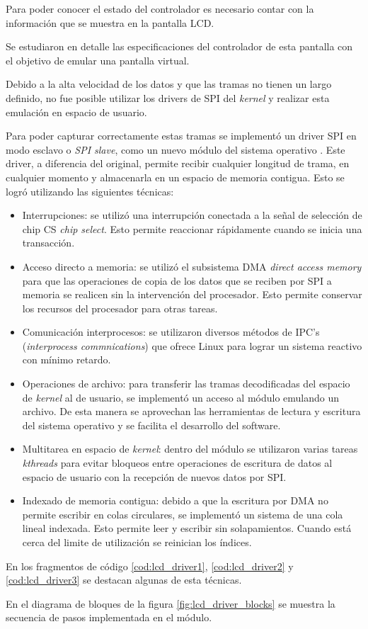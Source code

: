       Para poder conocer el estado del controlador es necesario contar con la información que se muestra en la pantalla LCD.\par
      Se estudiaron en detalle las especificaciones del controlador de esta pantalla con el objetivo de emular una pantalla virtual.\par
      Debido a la alta velocidad de los datos y que las tramas no tienen un largo definido, no fue posible utilizar los drivers de SPI del \textit{kernel} y realizar esta emulación en espacio de usuario.\par
      Para poder capturar correctamente estas tramas se implementó un driver SPI en modo esclavo o \textit{SPI slave}, como un nuevo módulo del sistema operativo \citep{ldd3}.
      Este driver, a diferencia del original, permite recibir cualquier longitud de trama, en cualquier momento y almacenarla en un espacio de memoria contigua.
      Esto se logró utilizando las siguientes técnicas:
      \begin{itemize}
         \item {Interrupciones: se utilizó una interrupción conectada a la señal de selección de chip CS \textit{chip select}. Esto permite reaccionar rápidamente cuando se inicia una transacción.}
         \item {Acceso directo a memoria: se utilizó el subsistema DMA \textit{direct access memory} para que las operaciones de copia de los datos que se reciben por SPI a memoria se realicen sin la intervención del procesador. Esto permite conservar los recursos del procesador para otras tareas.}
         \item{Comunicación interprocesos: se utilizaron diversos métodos de IPC's \citep{WEBSITE:kerneldocs} (\textit{interprocess commnications}) que ofrece Linux para lograr un sistema reactivo con mínimo retardo.}
         \item{Operaciones de archivo: para transferir las tramas decodificadas del espacio de \textit{kernel} al de usuario, se implementó un acceso al módulo emulando un archivo. De esta manera se aprovechan las herramientas de lectura y escritura del sistema operativo y se facilita el desarrollo del software.}
         \item{Multitarea en espacio de \textit{kernel}: dentro del módulo se utilizaron varias tareas \textit{kthreads} para evitar bloqueos entre operaciones de escritura de datos al espacio de usuario con la recepción de nuevos datos por SPI.}
         \item{Indexado de memoria contigua: debido a que la escritura por DMA no permite escribir en colas circulares, se implementó un sistema de una cola lineal indexada. Esto permite leer y escribir sin solapamientos. Cuando está cerca del limite de utilización se reinician los índices.}
      \end{itemize}
      En los fragmentos de código \ref{cod:lcd_driver1}, \ref{cod:lcd_driver2} y \ref{cod:lcd_driver3} se destacan algunas de esta técnicas.\par
      En el diagrama de bloques de la figura \ref{fig:lcd_driver_blocks} se muestra la secuencia de pasos implementada en el módulo.
      
